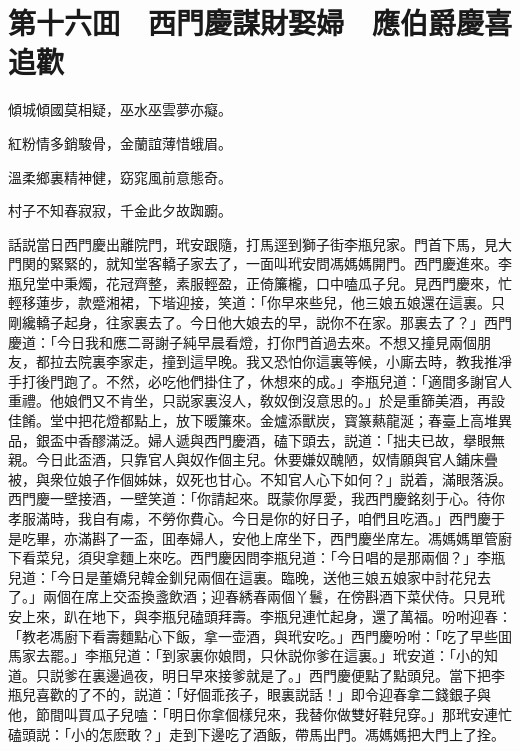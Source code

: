 
\chapter*{第十六囬　西門慶謀財娶婦　應伯爵慶喜追歡}

傾城傾國莫相疑，巫水巫雲夢亦癡。

紅粉情多銷駿骨，金蘭誼薄惜蛾眉。

溫柔鄉裏精神健，窈窕風前意態奇。

村子不知春寂寂，千金此夕故踟躕。

話説當日西門慶出離院門，玳安跟隨，打馬逕到獅子街李瓶兒家。門首下馬，見大門関的緊緊的，就知堂客轎子家去了，一面叫玳安問馮媽媽開門。西門慶進來。李瓶兒堂中秉燭，花冠齊整，素服輕盈，正倚簾櫳，口中嗑瓜子兒。見西門慶來，忙輕移蓮步，款蹙湘裙，下堦迎接，笑道：「你早來些兒，他三娘五娘還在這裏。只剛纔轎子起身，往家裏去了。今日他大娘去的早，説你不在家。那裏去了？」西門慶道：「今日我和應二哥謝子純早晨看燈，打你門首過去來。不想又撞見兩個朋友，都拉去院裏李家走，撞到這早晚。我又恐怕你這裏等候，小廝去時，教我推凈手打後門跑了。不然，必吃他們掛住了，休想來的成。」李瓶兒道：「適間多謝官人重禮。他娘們又不肯坐，只説家裏沒人，敎奴倒沒意思的。」於是重篩美酒，再設佳餚。堂中把花燈都點上，放下暖簾來。金爐添獸炭，寳篆爇龍涎；春臺上高堆異品，銀盃中香醪滿泛。婦人遞與西門慶酒，磕下頭去，説道：「拙夫已故，擧眼無親。今日此盃酒，只靠官人與奴作個主兒。休要嫌奴醜陋，奴情願與官人鋪床疊被，與衆位娘子作個姊妹，奴死也甘心。不知官人心下如何？」説着，滿眼落淚。西門慶一壁接酒，一壁笑道：「你請起來。既蒙你厚愛，我西門慶銘刻于心。待你孝服滿時，我自有䖏，不勞你費心。今日是你的好日子，咱們且吃酒。」西門慶于是吃畢，亦滿斟了一盃，囬奉婦人，安他上席坐下，西門慶坐席左。馮媽媽單管廚下看菜兒，須臾拿麵上來吃。西門慶因問李瓶兒道：「今日唱的是那兩個？」李瓶兒道：「今日是董嬌兒韓金釧兒兩個在這裏。臨晚，送他三娘五娘家中討花兒去了。」兩個在席上交盃換盞飲酒；迎春綉春兩個丫鬟，在傍斟酒下菜伏侍。只見玳安上來，趴在地下，與李瓶兒磕頭拜壽。李瓶兒連忙起身，還了萬福。吩咐迎春：「教老馮廚下看壽麵點心下飯，拿一壶酒，與玳安吃。」西門慶吩咐：「吃了早些囬馬家去罷。」李瓶兒道：「到家裏你娘問，只休説你爹在這裏。」玳安道：「小的知道。只説爹在裏邊過夜，明日早來接爹就是了。」西門慶便點了點頭兒。當下把李瓶兒喜歡的了不的，説道：「好個乖孩子，眼裏説話！」即令迎春拿二錢銀子與他，節間叫買瓜子兒嗑：「明日你拿個樣兒來，我替你做雙好鞋兒穿。」那玳安連忙磕頭説：「小的怎麽敢？」走到下邊吃了酒飯，帶馬出門。馮媽媽把大門上了拴。

